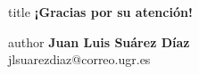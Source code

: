 \documentclass[10pt, compress]{beamer}
\makeatletter
\newcommand{\docauthor}{Juan Luis Suárez Díaz}
\newcommand{\docemail}{jlsuarezdiaz@correo.ugr.es}
\makeatother
\begin{document}
{ 
  \begin{frame}[plain]
    \vspace{0.1\paperheight}
    \begin{titleBox}
      \begin{beamercolorbox}[sep=8pt,center]{title}
        \textbf{¡Gracias por su atención!}
      \end{beamercolorbox}

  \begin{beamercolorbox}[sep=8pt,center]{author}  
          \large\textbf{\docauthor} \\
          \large\docemail
        \end{beamercolorbox}
      \end{titleBox}
    \end{frame}
  }
\end{document}
